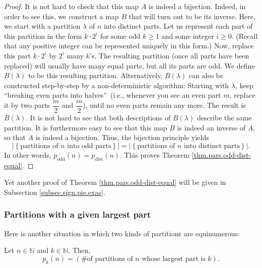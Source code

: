 \begin{proof}
It is not hard to check that this map $A$ is indeed a bijection. Indeed, in
order to see this, we construct a map $B$ that will turn out to be its
inverse. Here, we start with a partition $\lambda$ of $n$ into distinct parts.
Let us represent each part of this partition in the form $k\cdot2^{i}$ for
some odd $k\geq1$ and some integer $i\geq0$. (Recall that any positive integer
can be represented uniquely in this form.) Now, replace this part $k\cdot
2^{i}$ by $2^{i}$ many $k$'s. The resulting partition (once all parts have
been replaced) will usually have many equal parts, but all its parts are odd.
We define $B\left(  \lambda\right)  $ to be this resulting partition.
Alternatively, $B\left(  \lambda\right)  $ can also be constructed
step-by-step by a non-deterministic algorithm: Starting with $\lambda$, keep
\textquotedblleft breaking even parts into halves\textquotedblright\ (i.e.,
whenever you see an even part $m$, replace it by two parts $\dfrac{m}{2}$ and
$\dfrac{m}{2}$), until no even parts remain any more. The result is $B\left(
\lambda\right)  $. It is not hard to see that both descriptions of $B\left(
\lambda\right)  $ describe the same partition. It is furthermore easy to see
that this map $B$ is indeed an inverse of $A$, so that $A$ is indeed a
bijection. Thus, the bijection principle yields%
\[
\left\vert \left\{  \text{partitions of }n\text{ into odd parts}\right\}
\right\vert =\left\vert \left\{  \text{partitions of }n\text{ into distinct
parts}\right\}  \right\vert .
\]
In other words, $p_{\operatorname*{odd}}\left(  n\right)
=p_{\operatorname*{dist}}\left(  n\right)  $. This proves Theorem
\ref{thm.pars.odd-dist-equal}.
\end{proof}

Yet another proof of Theorem \ref{thm.pars.odd-dist-equal} will be given in
Subsection \ref{subsec.sign.pie.exas}.

\subsubsection{Partitions with a given largest part}

Here is another situation in which two kinds of partitions are equinumerous:

\begin{proposition}
\label{prop.pars.pkn=dual}Let $n\in\mathbb{N}$ and $k\in\mathbb{N}$. Then,%
\[
p_{k}\left(  n\right)  =\left(  \text{\# of partitions of }n\text{ whose
largest part is }k\right)  .
\]

\end{proposition}

